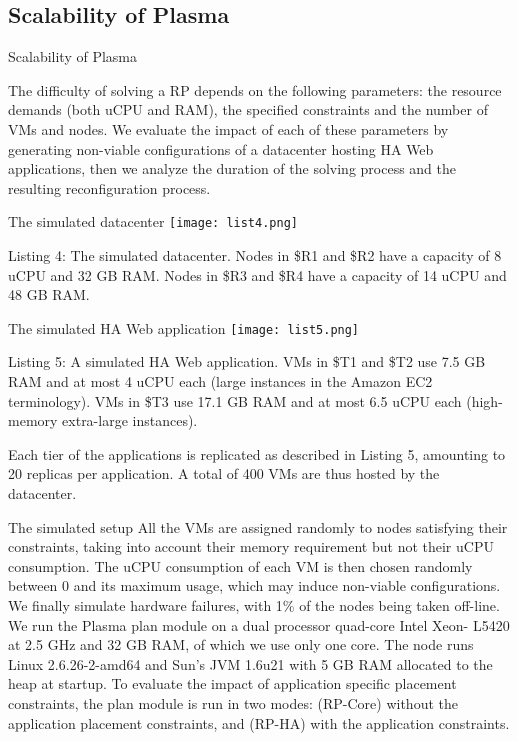 \subsection{Scalability of Plasma}
\begin{frame}{Scalability of Plasma}

The difficulty of solving a RP depends on the following parameters: the resource
demands (both uCPU and RAM), the specified constraints and the number of
VMs and nodes. We evaluate the impact of each of these parameters by generating 
non-viable configurations of a datacenter hosting HA Web applications, then
we analyze the duration of the solving process and the resulting reconfiguration
process.

\end{frame}
\begin{frame}{The simulated datacenter}
\texttt{[image: list4.png]} 

Listing 4: The simulated datacenter. Nodes in \$R1 and \$R2 have a capacity of
8 uCPU and 32 GB RAM. Nodes in \$R3 and \$R4 have a capacity of 14 uCPU
and 48 GB RAM.

\end{frame}
\begin{frame}{The simulated HA Web application}
\texttt{[image: list5.png]} 

Listing 5: A simulated HA Web application. VMs in \$T1 and \$T2 use 7.5 GB
RAM and at most 4 uCPU each (large instances in the Amazon EC2 terminology). 
VMs in \$T3 use 17.1 GB RAM and at most 6.5 uCPU each (high-memory
extra-large instances).

\br
Each tier of the applications is replicated as described in
Listing 5, amounting to 20 replicas per application. A total of 400 VMs are thus
hosted by the datacenter. 
\end{frame}
\begin{frame}{The simulated setup}
All the VMs are assigned randomly to nodes satisfying their constraints, taking 
into account their memory requirement but not their uCPU consumption.
The uCPU consumption of each VM is then chosen randomly between 0 and
its maximum usage, which may induce non-viable configurations. We finally
simulate hardware failures, with 1\% of the nodes being taken off-line.
\br \pause{}
    We run the Plasma plan module on a dual processor quad-core Intel Xeon-
L5420 at 2.5 GHz and 32 GB RAM, of which we use only one core. The node
runs Linux 2.6.26-2-amd64 and Sun’s JVM 1.6u21 with 5 GB RAM allocated
to the heap at startup. 
\br \pause{}
To evaluate the impact of application specific placement
constraints, the plan module is run in two modes: (RP-Core) without the 
application placement constraints, and (RP-HA) with the application constraints.

\end{frame}
